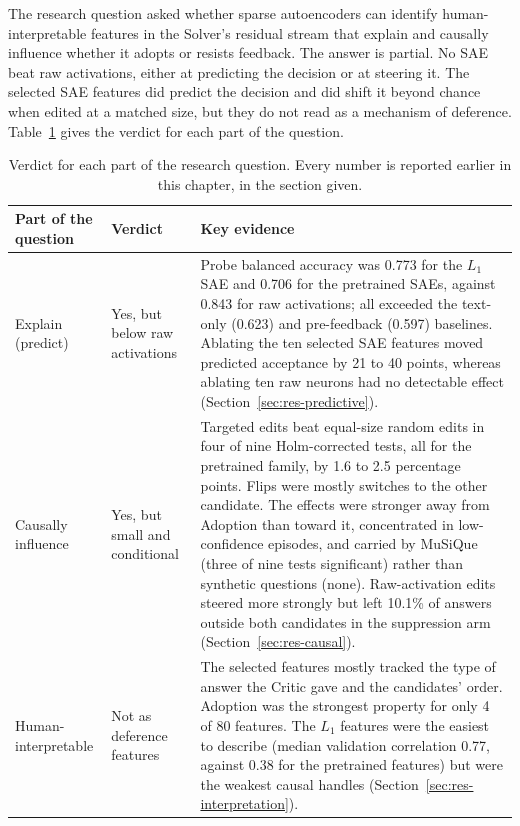 The research question asked whether sparse autoencoders can identify
human-interpretable features in the Solver's residual stream that explain and
causally influence whether it adopts or resists feedback. The answer is
partial. No SAE beat raw activations, either at predicting the decision or at
steering it. The selected SAE features did predict the decision and did shift
it beyond chance when edited at a matched size, but they do not read as a
mechanism of deference. Table~\ref{tab:overall-answer} gives the verdict for
each part of the question.

\begin{table}[htbp]
    \centering
    \small
    \caption{Verdict for each part of the research question. Every number is
    reported earlier in this chapter, in the section given.}
    \label{tab:overall-answer}
    \begin{tabular}{>{\raggedright\arraybackslash}p{}
                    >{\raggedright\arraybackslash}p{}
                    >{\raggedright\arraybackslash}p{}}
        \toprule
        Part of the question & Verdict & Key evidence \\
        \midrule
        Explain (predict) & Yes, but below raw activations &
        Probe balanced accuracy was 0.773 for the $L_1$ SAE and 0.706 for the
        pretrained SAEs, against 0.843 for raw activations; all exceeded the
        text-only (0.623) and pre-feedback (0.597) baselines. Ablating the ten
        selected SAE features moved predicted acceptance by 21 to 40 points,
        whereas ablating ten raw neurons had no detectable effect
        (Section~\ref{sec:res-predictive}). \\
        \addlinespace
        Causally influence & Yes, but small and conditional &
        Targeted edits beat equal-size random edits in four of nine
        Holm-corrected tests, all for the pretrained family, by 1.6 to 2.5
        percentage points. Flips were mostly switches to the other candidate.
        The effects were stronger away from Adoption than toward it,
        concentrated in low-confidence episodes, and carried by MuSiQue (three
        of nine tests significant) rather than synthetic questions (none).
        Raw-activation edits steered more strongly but left 10.1\% of answers
        outside both candidates in the suppression arm
        (Section~\ref{sec:res-causal}). \\
        \addlinespace
        Human-interpretable & Not as deference features &
        The selected features mostly tracked the type of answer the Critic gave
        and the candidates' order. Adoption was the strongest property for only
        4 of 80 features. The $L_1$ features were the easiest to describe
        (median validation correlation 0.77, against 0.38 for the pretrained
        features) but were the weakest causal handles
        (Section~\ref{sec:res-interpretation}). \\
        \bottomrule
    \end{tabular}
\end{table}

